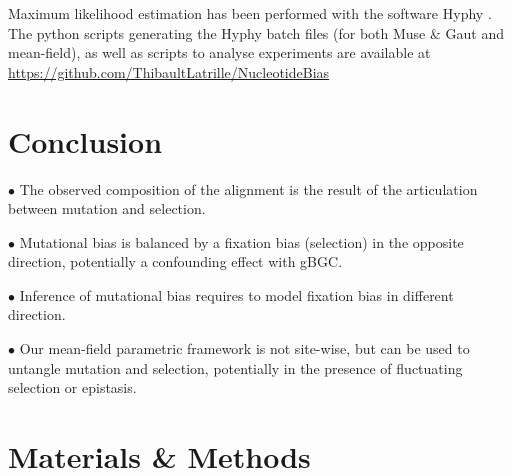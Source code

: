Maximum likelihood estimation has been performed with the software Hyphy \citep{Pond2005}.
The python scripts generating the Hyphy batch files (for both Muse \& Gaut and mean-field), as well as scripts to analyse experiments are available at \url{https://github.com/ThibaultLatrille/NucleotideBias}

\section{Conclusion}

$\bullet$ The observed composition of the alignment is the result of the articulation between mutation and selection.

$\bullet$ Mutational bias is balanced by a fixation bias (selection) in the opposite direction, potentially a confounding effect with gBGC.

$\bullet$ Inference of mutational bias requires to model fixation bias in different direction.

$\bullet$ Our mean-field parametric framework is not site-wise, but can be used to untangle mutation and selection, potentially in the presence of fluctuating selection or epistasis.

\section{Materials \& Methods}

